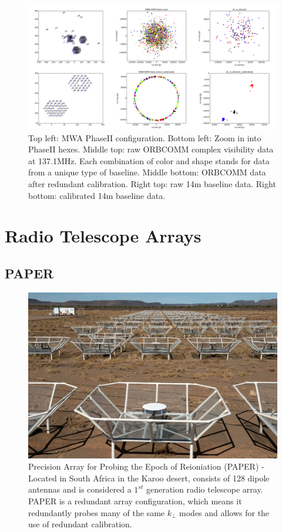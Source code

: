 \documentclass[a0,landscape]{a0poster}
\begin{document}
\begin{multicols}{4}
\begin{figure}[H]
\centering
\label{Redundant calibration on MWA PhaseII ORBCOMM data}
\includegraphics[width=0.85\linewidth]{figures/omnical_on_ORBCOMM.png}
\caption{Top left: MWA PhaseII configuration. Bottom left: Zoom in into PhaseII hexes. Middle top: raw ORBCOMM complex visibility data at 137.1MHz. Each combination of color and shape stands for data from a unique type of baseline. Middle bottom: ORBCOMM data after redundant calibration. Right top: raw 14m baseline data. Right bottom: calibrated 14m baseline data.}
\end{figure}



\section*{Radio Telescope Arrays}
\subsection*{PAPER}
\begin{figure}[H]
\centering
\label{fig:PAPER}
\includegraphics[width=0.6\linewidth]{figures/paper}
\caption{Precision Array for Probing the Epoch of Reioniation (PAPER) - Located in South Africa in the Karoo desert, consists of 128 dipole antennas and is considered a $1^{st}$ generation radio telescope array. PAPER is a redundant array configuration, which means it redundantly probes many of the same $k_\perp$ modes and allows for the use of redundant calibration.}
\end{figure}


\end{multicols}
\end{document}
